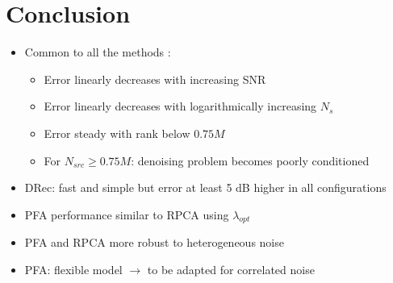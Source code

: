 \documentclass[9pt,xcolor=x11names,compress, notes=show]{beamer}%
\begin{document}
\begin{frame}{\insertsectionhead}
\begin{itemize}
		\begin{center}		
		\end{center}
	\end{itemize}
\end{frame}

\section{Conclusion}
\begin{frame}{\insertsectionhead}
	\begin{itemize}
       		\item Common to all the methods : 
		\begin{itemize}
	       		 \item Error linearly decreases with increasing SNR\\[2pt]
	       		 \item Error linearly decreases with logarithmically increasing $N_s$\\[2pt]
	       		 \item Error steady with rank below $0.75 M$\\[2pt]
	       		 \item For $N_{src} \geq 0.75 M$: denoising problem becomes poorly conditioned     \\[2pt]  		 
		\end{itemize}
		\item DRec: fast and simple but error at least 5 dB higher in all configurations
		\item PFA performance similar to RPCA using $\lambda_{opt}$
		\item PFA and RPCA more robust to heterogeneous noise	
		\item PFA: flexible model $\rightarrow$ to be adapted for correlated noise	
	\end{itemize}

\end{frame}
\end{document}
